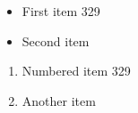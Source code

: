 \documentclass{article}
\begin{document}
\begin{itemize}
\item First item 329
\item Second item
\end{itemize}
\begin{enumerate}
\item Numbered item 329
\item Another item
\end{enumerate}
\end{document}
